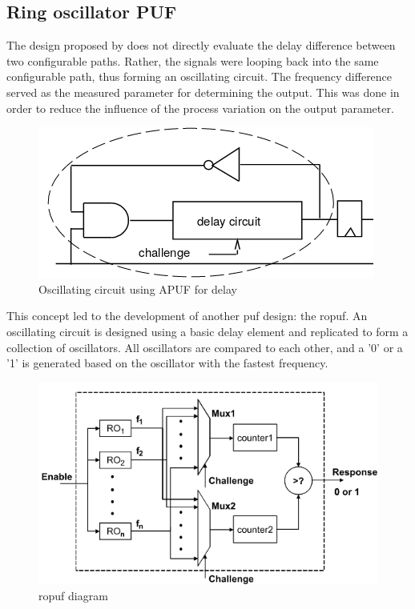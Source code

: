 \subsection{Ring oscillator PUF}

The design proposed by \cite{gassend_silicon_2002} does not directly evaluate the delay difference between two configurable paths. Rather, the signals were looping back into the same configurable path, thus forming an oscillating circuit. The frequency difference served as the measured parameter for determining the output. This was done in order to reduce the influence of the process variation on the output parameter.\\

\begin{figure}[H]
    \centering
    \includegraphics[width=0.6\linewidth]{images/RO_origine_Gassend_al_2002.png}
    \caption{Oscillating circuit using APUF for delay \cite{gassend_silicon_2002}}
    \label{fig:RO_ORIGINAL}
\end{figure}

This concept led to the development of another \acrshort{puf} design: the \acrfull{ropuf}. An oscillating circuit is designed using a basic delay element and replicated to form a collection of oscillators. All oscillators are compared to each other, and a '0' or a '1' is generated based on the oscillator with the fastest frequency.

\begin{figure}[H]
    \centering
    \includegraphics[width=0.7\linewidth]{images/RO_GENE_ORIGI_maiti_2009.png}
    \caption{\acrshort{ropuf} diagram \cite{maiti_improved_2009}}
    \label{fig:ROPUF}
\end{figure}

